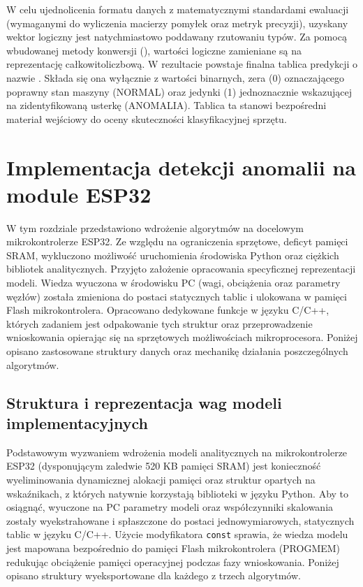 \documentclass[12pt,twoside]{article}
\begin{document}
W celu ujednolicenia formatu danych z matematycznymi standardami ewaluacji (wymaganymi do wyliczenia macierzy pomyłek oraz metryk precyzji), uzyskany wektor logiczny jest natychmiastowo poddawany rzutowaniu typów. Za pomocą wbudowanej metody konwersji (), wartości logiczne zamieniane są na reprezentację całkowitoliczbową. W rezultacie powstaje finalna tablica predykcji o nazwie . Składa się ona wyłącznie z wartości binarnych, zera (0) oznaczającego poprawny stan maszyny (NORMAL) oraz jedynki (1) jednoznacznie wskazującej na zidentyfikowaną usterkę (ANOMALIA). Tablica ta stanowi bezpośredni materiał wejściowy do oceny skuteczności klasyfikacyjnej sprzętu.

\section{Implementacja detekcji anomalii na module ESP32}

W tym rozdziale przedstawiono wdrożenie algorytmów na docelowym mikrokontrolerze ESP32. Ze względu na ograniczenia sprzętowe, deficyt pamięci SRAM, wykluczono możliwość uruchomienia środowiska Python oraz ciężkich bibliotek analitycznych. Przyjęto założenie opracowania specyficznej reprezentacji modeli. Wiedza wyuczona w środowisku PC (wagi, obciążenia oraz parametry węzłów) została zmieniona do postaci statycznych tablic i ulokowana w pamięci Flash mikrokontrolera. Opracowano dedykowane funkcje w języku C/C++, których zadaniem jest odpakowanie tych struktur oraz przeprowadzenie wnioskowania opierając się na sprzętowych możliwościach mikroprocesora. Poniżej opisano zastosowane struktury danych oraz mechanikę działania poszczególnych algorytmów.

\subsection{Struktura i reprezentacja wag modeli implementacyjnych}
Podstawowym wyzwaniem wdrożenia modeli analitycznych na mikrokontrolerze ESP32 (dysponującym zaledwie 520 KB pamięci SRAM) jest konieczność wyeliminowania dynamicznej alokacji pamięci oraz struktur opartych na wskaźnikach, z których natywnie korzystają biblioteki w języku Python. Aby to osiągnąć, wyuczone na PC parametry modeli oraz współczynniki skalowania zostały wyekstrahowane i spłaszczone do postaci jednowymiarowych, statycznych tablic w języku C/C++. Użycie modyfikatora \texttt{const} sprawia, że wiedza modelu jest mapowana bezpośrednio do pamięci Flash mikrokontrolera (PROGMEM) redukując obciążenie pamięci operacyjnej podczas fazy wnioskowania. Poniżej opisano struktury wyeksportowane dla każdego z trzech algorytmów.
\end{document}
